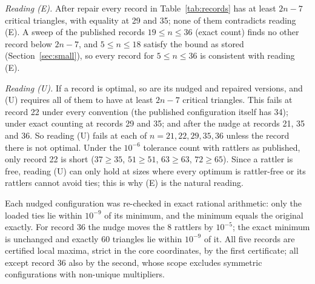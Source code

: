\documentclass[11pt]{amsart}
\theoremstyle{definition}
\begin{document}
\emph{Reading (E).} After repair every record in Table~\ref{tab:records} has at least $2n-7$ critical triangles, with equality at 29 and 35; none of them contradicts reading (E). A sweep of the published records $19 \le n \le 36$ (exact count) finds no other record below $2n-7$, and $5 \le n \le 18$ satisfy the bound as stored (Section~\ref{sec:small}), so every record for $5 \le n \le 36$ is consistent with reading (E). %

\emph{Reading (U).} If a record is optimal, so are its nudged and repaired versions, and (U) requires all of them to have at least $2n-7$ critical triangles. This fails at record 22 under every convention (the published configuration itself has 34); under exact counting at records 29 and 35; and after the nudge at records 21, 35 and 36. So reading (U) fails at each of $n = 21, 22, 29, 35, 36$ unless the record there is not optimal. Under the $10^{-6}$ tolerance count with rattlers as published, only record 22 is short ($37 \ge 35$, $51 \ge 51$, $63 \ge 63$, $72 \ge 65$). Since a rattler is free, reading (U) can only hold at sizes where every optimum is rattler-free or its rattlers cannot avoid ties; this is why (E) is the natural reading. %

Each nudged configuration was re-checked in exact rational arithmetic: only the loaded ties lie within $10^{-9}$ of its minimum, and the minimum equals the original exactly. For record 36 the nudge moves the 8 rattlers by $10^{-5}$; the exact minimum is unchanged and exactly 60 triangles lie within $10^{-9}$ of it. %
All five records are certified local maxima, strict in the core coordinates, by the first certificate; all except record 36 also by the second, whose scope excludes symmetric configurations with non-unique multipliers. %

\end{document}
